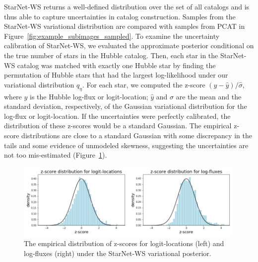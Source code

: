 StarNet-WS returns a well-defined distribution over the set of all catalogs
and is thus able to capture uncertainties in catalog construction. 
Samples from the StarNet-WS variational distribution are compared with samples from PCAT in Figure~\ref{fig:example_subimages_sampled}. 
To examine the uncertainty calibration of StarNet-WS, we evaluated the approximate posterior 
conditional on the true number of stars in the Hubble catalog. 
Then, each star in the StarNet-WS catalog was matched with exactly one Hubble star by finding the permutation of Hubble stars that had the largest log-likelihood under our variational distribution $q_\eta$. 
For each star, we computed the z-score $(y - \hat y) / \hat \sigma$, where $y$ is the Hubble log-flux or 
logit-location; $\hat y$ and $\hat\sigma$ are the mean and the standard deviation, respectively, of the Gaussian variational distribution for the log-flux or logit-location.
If the uncertainties were perfectly calibrated, the distribution of these z-scores would be a standard Gaussian. 
The empirical z-score distributions are close to a standard Gaussian with some discrepancy in the tails and some evidence of unmodeled skewness, suggesting the uncertainties are not too mis-estimated (Figure~\ref{fig:z-score_calibration}). 

\begin{figure}[tb]
    \centering
    \includegraphics[width=0.99\textwidth]{figures/m2_results/zscore_calibration.png}
    \caption{The empirical distribution of z-scores for logit-locations (left) and log-fluxes (right) under the StarNet-WS variational posterior. 
}
    \label{fig:z-score_calibration}
\end{figure}


